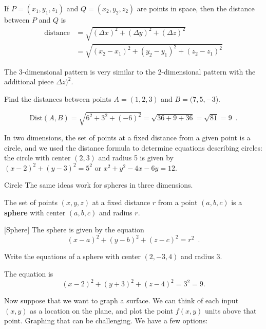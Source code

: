 \begin{theorem}
If $P=(x_1,y_1,z_1)$ and $Q=(x_2,y_2,z_2)$ are points in space, then the distance between $P$ and $Q$ is
\begin{align*}
\mbox{distance} &= \sqrt{(\Delta x)^2 + (\Delta y)^2 + (\Delta z)^2} \\
                &= \sqrt{(x_2-x_1)^2 + (y_2-y_1)^2 + (z_2-z_1)^2}
\end{align*}
\end{theorem}

The 3-dimensional pattern is very similar to the 2-dimensional pattern with the additional piece $\Delta z)^2$.

\begin{example}
Find the distances between points $A=(1,2,3)$ and $B=(7,5,-3$).

\begin{solution}
  $$\mbox{Dist}(A,B) = \sqrt{6^2+3^2+(-6)^2} = \sqrt{36+9+36} = \sqrt{81} = 9 \enspace .$$
\end{solution}\end{example}

In two dimensions, the set of points at a fixed distance from a given point is a circle, and we used the distance formula to determine equations describing circles: the circle with center $(2, 3)$ and radius 5 is given by $(x-2)^2 + (y-3)^2 = 5^2$ or $x^2+y^2-4x-6y = 12$.

Circle
The same ideas work for spheres in three dimensions.

\begin{definition}[Sphere]
The set of points $(x,y,z)$ at a fixed distance $r$ from a point $(a,b,c)$ is a {\bf sphere} with center $(a,b,c)$ and radius $r$.

[Sphere]
The sphere is given by the equation
$$(x-a)^2+(y-b)^2+(z-c)^2=r^2 \enspace .$$
\end{definition}

\begin{example}
Write the equations of a sphere with center $(2, -3, 4)$ and radius 3.

\begin{solution} The equation is
$$(x-2)^2+(y+3)^2+(z-4)^2=3^2=9.$$
\end{solution}\end{example}

Now suppose that we want to graph a surface. We can think of each input $(x,y)$ as a location on the plane, and plot the point $f(x,y)$ units above that point. Graphing that can be challenging. We have a few options:

